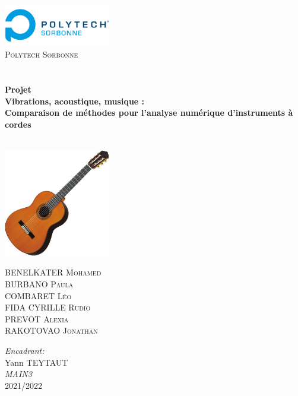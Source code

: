 \begin{titlepage}
\begin{center}

\includegraphics[width=0.35\textwidth]{./Logo_Polytech_Sorbonne}~\\[1cm]

\textsc{\LARGE Polytech Sorbonne}\\[1.5cm]

\textsc{\Large }\\[0.5cm]

\HRule \\[0.4cm]

{\huge \bfseries Projet\\
Vibrations, acoustique, musique :\\
Comparaison de méthodes pour l’analyse numérique d’instruments à cordes \\[0.4cm] }

\HRule \\[1.5cm]

\includegraphics[width=0.35\textwidth]{./guitare}~\\[1cm]

\begin{minipage}{0.4\textwidth}
\begin{flushleft} \large
BENELKATER \textsc{Mohamed}\\
BURBANO \textsc{Paula}\\
COMBARET \textsc{Léo}\\
FIDA CYRILLE \textsc{Rudio}\\
PREVOT \textsc{Alexia}\\
RAKOTOVAO \textsc{Jonathan}
\end{flushleft}
\end{minipage}
\begin{minipage}{0.4\textwidth}
\begin{flushright} \large
\emph{Encadrant:} \\
Yann \textsc{TEYTAUT}\\
\emph{MAIN3} \\
2021/2022
\end{flushright}
\end{minipage}

\vfill


\end{center}
\end{titlepage}
